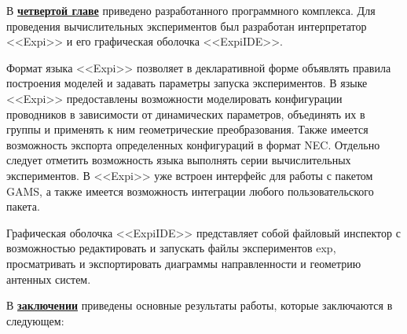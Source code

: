 В \underline{\textbf{четвертой главе}} приведено разработанного программного комплекса. Для проведения вычислительных экспериментов был разработан интерпретатор <<Expi>> и его графическая оболочка <<ExpiIDE>>.

Формат языка <<Expi>> позволяет в декларативной форме объявлять правила построения моделей и задавать параметры запуска экспериментов.
В языке <<Expi>> предоставлены возможности моделировать конфигурации проводников в зависимости от динамических параметров, объединять их в группы и применять к ним геометрические преобразования. Также имеется возможность экспорта определенных конфигураций в формат NEC. Отдельно следует отметить возможность языка выполнять серии вычислительных экспериментов. В <<Expi>> уже встроен интерфейс для работы с пакетом GAMS, а также имеется возможность интеграции любого пользовательского пакета.

Графическая оболочка <<ExpiIDE>> представляет собой файловый инспектор с возможностью редактировать и запускать файлы экспериментов exp, просматривать и экспортировать диаграммы направленности и геометрию антенных систем.

\FloatBarrier
{}                                  %
В \underline{\textbf{заключении}} приведены основные результаты работы, которые заключаются в следующем:

